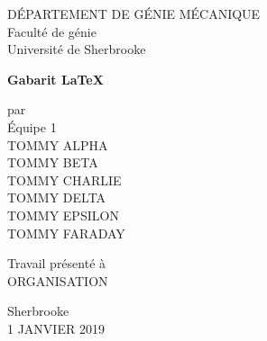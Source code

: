 \begin{titlepage}
    \begin{center}
        \large
        DÉPARTEMENT DE GÉNIE MÉCANIQUE\\
        Faculté de génie\\
        Université de Sherbrooke\\
        
        \vspace{3cm}
 
        \Huge
        \textbf{Gabarit \LaTeX}
        
        \large
 
        \vspace{3cm}
 
        par\\
        Équipe 1\\
        TOMMY ALPHA\\
        TOMMY BETA\\
        TOMMY CHARLIE\\
        TOMMY DELTA\\
        TOMMY EPSILON\\
        TOMMY FARADAY\\
 
        \vfill
 
        Travail présenté à\\
        ORGANISATION
 
        \vspace{1.5cm}
 
 
        \Large
        Sherbrooke\\
        1 JANVIER 2019
 
    \end{center}
\end{titlepage}